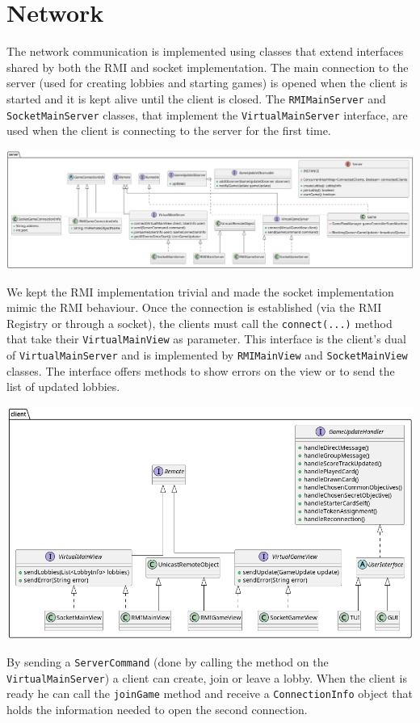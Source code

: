 \documentclass{article}
\begin{document}
\section{Network}
The network communication is implemented using classes that extend interfaces shared by both the RMI and socket implementation.
The main connection to the server (used for creating lobbies and starting games) is opened when the client is started and it
is kept alive until the client is closed.
The \texttt{RMIMainServer} and \texttt{SocketMainServer} classes, that implement the \texttt{VirtualMainServer} interface,
are used when the client is connecting to the server for the first time.
\begin{center}
    \includegraphics[scale=0.25]{pngs/server1}
\end{center}
We kept the RMI implementation trivial and made the socket implementation mimic the RMI behaviour.
Once the connection is established (via the RMI Registry or through a socket), the clients must call the \texttt{connect(...)} method
that take their \texttt{VirtualMainView} as parameter.
This interface is the client's dual of \texttt{VirtualMainServer} and is implemented by \texttt{RMIMainView} and \texttt{SocketMainView} classes.
The interface offers methods to show errors on the view or to send the list of updated lobbies.
\begin{center}
    \includegraphics[scale=0.3]{pngs/client}
\end{center}
By sending a \texttt{ServerCommand} (done by calling the method on the \texttt{VirtualMainServer}) a client can create, join or leave a lobby.
When the client is ready he can call the \texttt{joinGame} method and receive a \texttt{ConnectionInfo} object that holds
the information needed to open the second connection.
\end{document}
